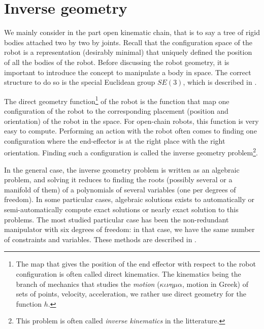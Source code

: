 \documentclass{book}
\begin{document}
\chapter{Inverse geometry}

We mainly consider in the part open kinematic chain, that is to say a tree of rigid bodies attached two by two by joints. Recall that the configuration space of the robot is a representation (desirably minimal) that uniquely defined the position of all the bodies of the robot. Before discussing the robot geometry, it is important to introduce the concept to manipulate a body in space. The correct structure to do so is the special Euclidean group $SE(3)$, which is described in .

The direct geometry function\footnote{The map that gives the position of the end effector with respect to the robot configuration is often called direct kinematics. The kinematics being the branch of mechanics that studies the \textit{motion} ($\kappa \iota \nu \eta \mu \alpha$, motion in Greek) of sets of points, \mie velocity, acceleration, we rather use direct geometry for the function $h$.} of the robot is the function that map one configuration of the robot to the corresponding placement (position and orientation) of the robot in the space. For open-chain robots, this function is very easy to compute. Performing an action with the robot often comes to finding one configuration where the end-effector is at the right place with the right orientation. Finding such a configuration is called the inverse geometry problem\footnote{This problem is often called \emph{inverse kinematics} in the litterature.}. 

In the general case, the inverse geometry problem is written as an algebraic problem, and solving it reduces to finding the roots (possibly several or a manifold of them) of a polynomials of several variables (one per degrees of freedom). In some particular cases, algebraic solutions exists to automatically or semi-automatically compute exact solutions or nearly exact solution to this problems. The most studied particular case has been the non-redundant manipulator with six degrees of freedom: in that case, we have the same number of constraints and variables. These methods are described in . 
\end{document}

